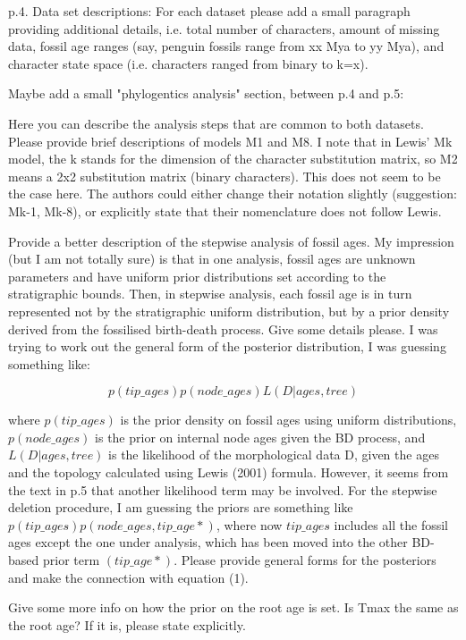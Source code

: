 \documentclass[11pt]{article}
\begin{document}
p.4. Data set descriptions: For each dataset please add a small paragraph providing additional details, i.e. total number of characters, amount of missing data, fossil age ranges (say, penguin fossils range from xx Mya to yy Mya), and character state space (i.e. characters ranged from binary to k=x).

Maybe add a small "phylogentics analysis" section, between p.4 and p.5: 

Here you can describe the analysis steps that are common to both datasets. Please provide brief descriptions of models M1 and M8. I note that in Lewis' Mk model, the k stands for the dimension of the character substitution matrix, so M2 means a 2x2 substitution matrix (binary characters). This does not seem to be the case here. The authors could either change their notation slightly (suggestion: Mk-1, Mk-8), or explicitly state that their nomenclature does not follow Lewis. 

Provide a better description of the stepwise analysis of fossil ages. My impression (but I am not totally sure) is that in one analysis, fossil ages are unknown parameters and have uniform prior distributions set according to the stratigraphic bounds. Then, in stepwise analysis, each fossil age is in turn represented not by the stratigraphic uniform distribution, but by a prior density derived from the fossilised birth-death process. Give some details please. I was trying to work out the general form of the posterior distribution, I was guessing something like:

$$p(tip\_ages) p(node\_ages) L(D|ages,tree)$$

where $p(tip\_ages)$ is the prior density on fossil ages using uniform distributions, $p(node\_ages)$ is the prior on internal node ages given the BD process, and $L(D|ages,tree)$ is the likelihood of the morphological data D, given the ages and the topology calculated using Lewis (2001) formula. However, it seems from the text in p.5 that another likelihood term may be involved. For the stepwise deletion procedure, I am guessing the priors are something like $p(tip\_ages\hat{}) p(node\_ages, tip\_age*)$, where now $tip\_ages\hat{}$ includes all the fossil ages except the one under analysis, which has been moved into the other BD-based prior term $(tip\_age*)$. Please provide general forms for the posteriors and make the connection with equation (1).

Give some more info on how the prior on the root age is set. Is Tmax the same as the root age? If it is, please state explicitly.
\end{document}

